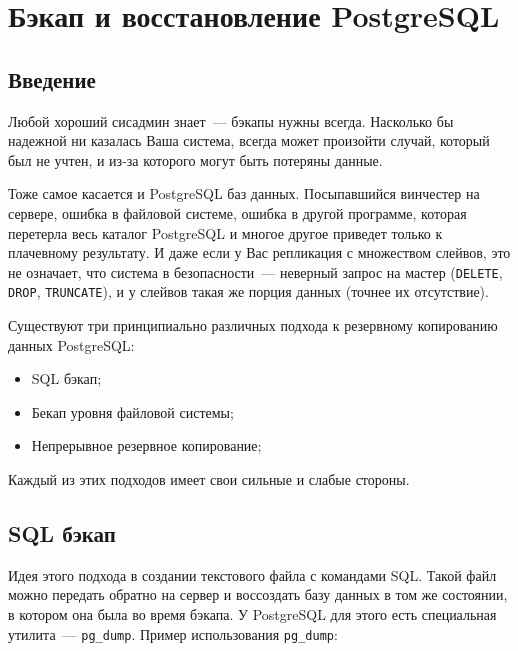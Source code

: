 \chapter{Бэкап и восстановление PostgreSQL}

\begin{epigraphs}
\end{epigraphs}

\section{Введение}

Любой хороший сисадмин знает~--- бэкапы нужны всегда. Насколько бы надежной ни казалась Ваша система, всегда может произойти случай, который был не учтен, и из-за которого могут быть потеряны данные.

Тоже самое касается и PostgreSQL баз данных. Посыпавшийся винчестер на сервере, ошибка в файловой системе, ошибка в другой программе, которая перетерла весь каталог PostgreSQL и многое другое приведет только к плачевному результату. И даже если у Вас репликация с множеством слейвов, это не означает, что система в безопасности~--- неверный запрос на мастер (\lstinline!DELETE!, \lstinline!DROP!, \lstinline!TRUNCATE!), и у слейвов такая же порция данных (точнее их отсутствие).

Существуют три принципиально различных подхода к резервному копированию данных PostgreSQL:

\begin{itemize}
  \item SQL бэкап;
  \item Бекап уровня файловой системы;
  \item Непрерывное резервное копирование;
\end{itemize}

Каждый из этих подходов имеет свои сильные и слабые стороны.


\section{SQL бэкап}

Идея этого подхода в создании текстового файла с командами SQL. Такой файл можно передать обратно на сервер и воссоздать базу данных в том же состоянии, в котором она была во время бэкапа. У PostgreSQL для этого есть специальная утилита~--- \lstinline!pg_dump!. Пример использования \lstinline!pg_dump!:

